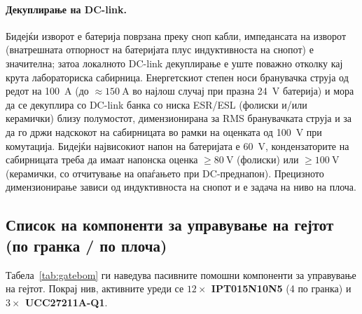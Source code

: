 \documentclass[journal,onecolumn,11pt]{IEEEtran}
\begin{document}
\paragraph{Декуплирање на DC-link.} Бидејќи изворот е батерија поврзана преку сноп
кабли, импедансата на изворот (внатрешната отпорност на батеријата плус
индуктивноста на снопот) е значителна; затоа локалното DC-link декуплирање е уште
поважно отколку кај крута лабораториска сабирница. Енергетскиот степен носи бранувачка
струја од редот на \SI{100}{\ampere} (до $\approx\SI{150}{\ampere}$ во најлош случај
при празна \SI{24}{\volt} батерија) и мора да се декуплира со DC-link банка со ниска
ESR/ESL (фолиски и/или керамички) близу полумостот, димензионирана за RMS бранувачката
струја и за да го држи надскокот на сабирницата во рамки на оценката од
\SI{100}{\volt} при комутација. Бидејќи највисокиот напон на батеријата е
\SI{60}{\volt}, кондензаторите на сабирницата треба да имаат напонска оценка
$\ge\SI{80}{\volt}$ (фолиски) или $\ge\SI{100}{\volt}$ (керамички, со отчитување на
опаѓањето при DC-преднапон). Прецизното димензионирање зависи од индуктивноста на
снопот и е задача на ниво на плоча.

\subsection{Список на компоненти за управување на гејтот (по гранка / по плоча)}
Табела~\ref{tab:gatebom} ги наведува пасивните помошни компоненти за управување на
гејтот. Покрај нив, активните уреди се \textbf{$12\times$ IPT015N10N5} (4 по гранка)
и \textbf{$3\times$ UCC27211A-Q1}.
\end{document}
